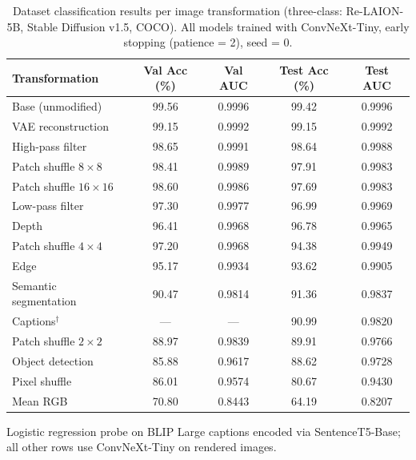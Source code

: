 \begin{table}[htbp]
	\centering
	\small
	\begin{threeparttable}
		\begin{tabular}{p{4cm}cccc}
			\toprule
			\textbf{Transformation}    &
			\textbf{Val Acc (\%)}      & \textbf{Val AUC}  &
			\textbf{Test Acc (\%)}     & \textbf{Test AUC}                           \\
			\midrule
			Base (unmodified)          & 99.56             & 0.9996 & 99.42 & 0.9996 \\
			VAE reconstruction         & 99.15             & 0.9992 & 99.15 & 0.9992 \\
			High-pass filter           & 98.65             & 0.9991 & 98.64 & 0.9988 \\
			Patch shuffle $8\times8$   & 98.41             & 0.9989 & 97.91 & 0.9983 \\
			Patch shuffle $16\times16$ & 98.60             & 0.9986 & 97.69 & 0.9983 \\
			Low-pass filter            & 97.30             & 0.9977 & 96.99 & 0.9969 \\
			Depth                      & 96.41             & 0.9968 & 96.78 & 0.9965 \\
			Patch shuffle $4\times4$   & 97.20             & 0.9968 & 94.38 & 0.9949 \\
			Edge                       & 95.17             & 0.9934 & 93.62 & 0.9905 \\
			Semantic segmentation      & 90.47             & 0.9814 & 91.36 & 0.9837 \\
			Captions$^\dagger$         & ---               & ---    & 90.99 & 0.9820 \\
			Patch shuffle $2\times2$   & 88.97             & 0.9839 & 89.91 & 0.9766 \\
			Object detection           & 85.88             & 0.9617 & 88.62 & 0.9728 \\
			Pixel shuffle              & 86.01             & 0.9574 & 80.67 & 0.9430 \\
			Mean RGB                   & 70.80             & 0.8443 & 64.19 & 0.8207 \\
			\bottomrule
		\end{tabular}
		\begin{tablenotes}
			\footnotesize
			\item[$\dagger$] Logistic regression probe on BLIP Large captions encoded via
			SentenceT5-Base; all other rows use ConvNeXt-Tiny on rendered images.
		\end{tablenotes}
	\end{threeparttable}
	\caption{Dataset classification results per image transformation (three-class:
		Re-LAION-5B, Stable Diffusion v1.5, COCO). All models trained with ConvNeXt-Tiny,
		early stopping (patience = 2), seed = 0.}
	\label{tab:dataset_classification_results}
\end{table}

